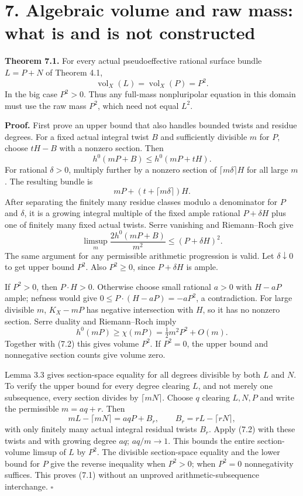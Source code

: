 \documentclass[
  10pt,
]{article}
\begin{document}
\section{7. Algebraic volume and raw mass: what is and is not
constructed}\label{algebraic-volume-and-raw-mass-what-is-and-is-not-constructed}

\textbf{Theorem 7.1.} For every actual pseudoeffective rational surface
bundle \(L=P+N\) of Theorem 4.1, \[
 \operatorname{vol}_X(L)=\operatorname{vol}_X(P)=P^2.             \tag{7.1}
\] In the big case \(P^2>0\). Thus any full-mass nonpluripolar equation
in this domain must use the raw mass \(P^2\), which need not equal
\(L^2\).

\textbf{Proof.} First prove an upper bound that also handles bounded
twists and residue degrees. For a fixed actual integral twist \(B\) and
sufficiently divisible \(m\) for \(P\), choose \(tH-B\) with a nonzero
section. Then \[
 h^0(mP+B)\leq h^0(mP+tH).
\] For rational \(\delta>0\), multiply further by a nonzero section of
\(\lceil m\delta\rceil H\) for all large \(m\). The resulting bundle is
\[
 mP+(t+\lceil m\delta\rceil)H.
\] After separating the finitely many residue classes modulo a
denominator for \(P\) and \(\delta\), it is a growing integral multiple
of the fixed ample rational \(P+\delta H\) plus one of finitely many
fixed actual twists. Serre vanishing and Riemann--Roch give \[
 \limsup_m \frac{2h^0(mP+B)}{m^2}\leq(P+\delta H)^2.
                                                               \tag{7.2}
\] The same argument for any permissible arithmetic progression is
valid. Let \(\delta\downarrow0\) to get upper bound \(P^2\). Also
\(P^2\geq0\), since \(P+\delta H\) is ample.

If \(P^2>0\), then \(P\cdot H>0\). Otherwise choose small rational
\(a>0\) with \(H-aP\) ample; nefness would give
\(0\leq P\cdot(H-aP)=-aP^2\), a contradiction. For large divisible
\(m\), \(K_X-mP\) has negative intersection with \(H\), so it has no
nonzero section. Serre duality and Riemann--Roch imply \[
 h^0(mP)\geq\chi(mP)=\tfrac12m^2P^2+O(m).
\] Together with (7.2) this gives volume \(P^2\). If \(P^2=0\), the
upper bound and nonnegative section counts give volume zero.

Lemma 3.3 gives section-space equality for all degrees divisible by both
\(L\) and \(N\). To verify the upper bound for every degree clearing
\(L\), and not merely one subsequence, every section divides by
\(\lceil mN\rceil\). Choose \(q\) clearing \(L,N,P\) and write the
permissible \(m=aq+r\). Then \[
 mL-\lceil mN\rceil=aqP+B_r,
 \qquad B_r=rL-\lceil rN\rceil,
\] with only finitely many actual integral residual twists \(B_r\).
Apply (7.2) with these twists and with growing degree \(aq\);
\(aq/m\to1\). This bounds the entire section-volume limsup of \(L\) by
\(P^2\). The divisible section-space equality and the lower bound for
\(P\) give the reverse inequality when \(P^2>0\); when \(P^2=0\)
nonnegativity suffices. This proves (7.1) without an unproved
arithmetic-subsequence interchange. \(\square\)
\end{document}
